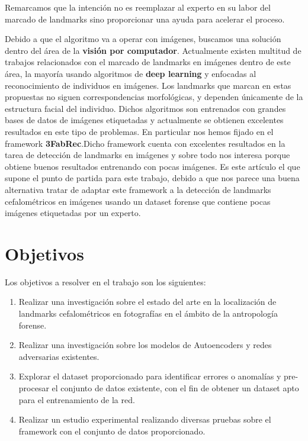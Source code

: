 \noindent Remarcamos que la intención no es reemplazar al experto en su labor del marcado de landmarks sino proporcionar una ayuda para acelerar el proceso.

\medskip 

\noindent Debido a que el algoritmo va a operar con imágenes, buscamos una solución dentro del área de la \textbf{visión por computador}. Actualmente existen  multitud de trabajos relacionados con el marcado de landmarks en imágenes dentro de este área, la mayoría usando algoritmos de \textbf{deep learning} y enfocadas al reconocimiento de individuos en imágenes. Los landmarks que marcan en estas propuestas no siguen correspondencias morfológicas, y dependen únicamente de la estructura facial del individuo. Dichos algoritmos son entrenados con grandes bases de datos de imágenes etiquetadas y actualmente se obtienen excelentes resultados en este tipo de problemas. En particular nos hemos fijado en el framework \textbf{3FabRec}\cite{browatzki20203fabrec}.Dicho framework cuenta con excelentes resultados en la tarea de detección de landmarks en imágenes y sobre todo nos interesa porque obtiene buenos resultados entrenando con pocas imágenes. Es este artículo el que supone el punto de partida para este trabajo, debido a que nos parece una buena alternativa tratar de adaptar este framework a la detección de landmarks cefalométricos en imágenes usando un dataset forense que contiene pocas imágenes etiquetadas por un experto.

\section{Objetivos}

\noindent Los objetivos a resolver en el trabajo son los siguientes: 

\begin{enumerate}
    \item Realizar una investigación sobre el estado del arte en la localización de landmarks cefalométricos en fotografías en el ámbito de la antropología forense.
    \item Realizar una investigación sobre los modelos de Autoencoders y redes adversarias existentes.
    \item Explorar el dataset proporcionado para identificar errores o anomalías y pre-procesar el conjunto de datos existente, con el fin de obtener un dataset apto para el entrenamiento de la red.
    \item Realizar un estudio experimental realizando diversas pruebas sobre el framework con el conjunto de datos proporcionado.
\end{enumerate}

